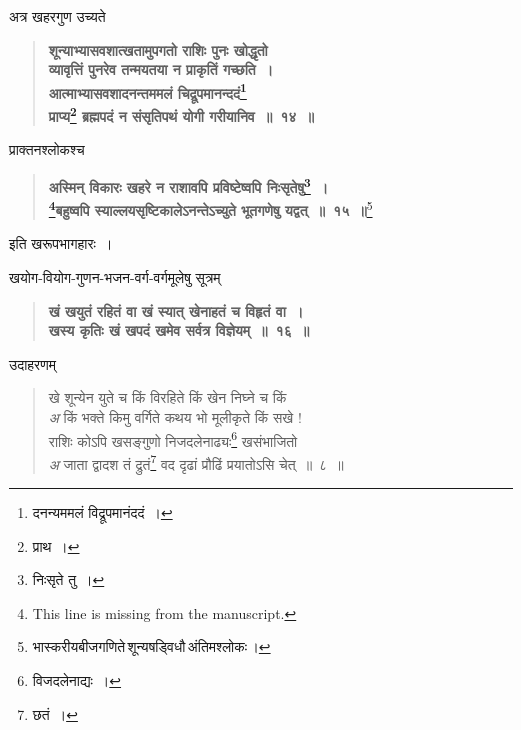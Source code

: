 \documentclass[11pt, openany]{book}
\begin{document}
अत्र खहरगुण उच्यते \textendash 

\begin{quote}
\textbf{{\color{purple}शून्याभ्यासवशात्खतामुपगतो राशिः पुनः खोद्धृतो\\
व्यावृत्तिं पुनरेव तन्मयतया न प्राकृतिं गच्छति~। \\
आत्माभ्यासवशादनन्तममलं चिद्रूपमानन्ददं\renewcommand{\thefootnote}{५}\footnote{दनन्यममलं विद्रूपमानंददं~।} \\
प्राप्य\renewcommand{\thefootnote}{६}\footnote{प्राथ~।} ब्रह्मपदं न संसृतिपथं योगी गरीयानिव~॥~१४~॥}}
\end{quote}

प्राक्तनश्लोकश्च \textendash 

\begin{quote}
\textbf{{\color{purple}अस्मिन् विकारः खहरे न राशावपि प्रविष्टेष्वपि निःसृतेषु\renewcommand{\thefootnote}{७}\footnote{निःसृते तु~।}~।\\
\renewcommand{\thefootnote}{*}\footnote{This line is missing from the manuscript.}बहुष्वपि स्याल्लयसृष्टिकालेऽनन्तेऽच्युते भूतगणेषु यद्वत्~॥~१५~॥}}\renewcommand{\thefootnote}{८}\footnote{भास्करीयबीजगणिते\,शून्यषड्विधौ\,अंतिमश्लोकः\,।}
\end{quote}

\begin{center}
इति खरूपभागहारः~।
\end{center}

खयोग-वियोग-गुणन-भजन-वर्ग-वर्गमूलेषु सूत्रम् \textendash 

\begin{quote}
\textbf{{\color{purple}खं खयुतं रहितं वा खं स्यात् खेनाहतं च विहृतं वा~।\\
खस्य कृतिः खं खपदं खमेव सर्वत्र विज्ञेयम्~॥~१६~॥}}
\end{quote}

\newpage

उदाहरणम् \textendash 

\begin{quote}
{\color{red}खे शून्येन युते च किं विरहिते किं खेन निघ्ने च किं\\
\emph{\color{white}अ} \hspace{2mm} किं भक्ते किमु वर्गिते कथय भो मूलीकृते किं सखे ! \\
राशिः कोऽपि खसङ्गुणो निजदलेनाढ्यः\renewcommand{\thefootnote}{१}\footnote{विजदलेनाद्यः~।} खसंभाजितो\\
\emph{\color{white}अ} \hspace{2mm} जाता द्वादश तं द्रुतं\renewcommand{\thefootnote}{२}\footnote{छतं~।} वद दृढां प्रौढिं प्रयातोऽसि चेत्~॥~८~॥ }
\end{quote}
\end{document}
